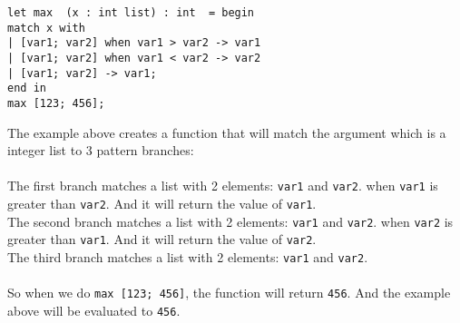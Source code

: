 \documentclass[]{article}
\begin{document}
			\begin{lstlisting}[caption={Variable patterns example 1}, label=PMVariableEx1]
let max  (x : int list) : int  = begin
match x with
| [var1; var2] when var1 > var2 -> var1
| [var1; var2] when var1 < var2 -> var2
| [var1; var2] -> var1;
end in
max [123; 456];
			\end{lstlisting}

			The example above creates a function that will match the argument
			which is a integer list to 3 pattern branches:\\\\

			The first branch matches a list with 2 elements: \lstinline|var1| and \lstinline|var2|.
			when \lstinline|var1| is greater than \lstinline|var2|.
			And it will return the value of \lstinline|var1|.\\
			
			The second branch matches a list with 2 elements: \lstinline|var1| and \lstinline|var2|.
			when \lstinline|var2| is greater than \lstinline|var1|.
			And it will return the value of \lstinline|var2|.\\
			
			The third branch matches a list with 2 elements: \lstinline|var1| and \lstinline|var2|.\\\\

			So when we do \lstinline|max [123; 456]|, the function will return \lstinline|456|.
			And the example above will be evaluated to \lstinline|456|.
\end{document}
